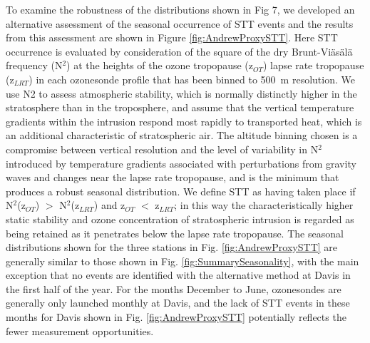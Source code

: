 \documentclass{article}
\begin{document}
  
  To examine the robustness of the distributions shown in Fig 7, we developed an alternative assessment of the seasonal occurrence of STT events and the results from this assessment are shown in Figure \ref{fig:AndrewProxySTT}.
  Here STT occurrence is evaluated by consideration of the square of the dry Brunt-Viäsälä frequency (N$^2$) at the heights of the ozone tropopause (z$_{OT}$) lapse rate tropopause (z$_{LRT}$) in each ozonesonde profile that has been binned to 500~m resolution.
  We use N2 to assess atmospheric stability, which is normally distinctly higher in the stratosphere than in the troposphere, and assume that the vertical temperature gradients within the intrusion respond most rapidly to transported heat, which is an additional characteristic of stratospheric air.
  The altitude binning chosen is a compromise between vertical resolution and the level of variability in N$^2$ introduced by temperature gradients associated with perturbations from gravity waves and changes near the lapse rate tropopause, and is the minimum that produces a robust seasonal distribution.
  We define STT as having taken place if N$^2$(z$_{OT}$) $>$ N$^2$(z$_{LRT}$) and z$_{OT}$ $<$ z$_{LRT}$; in this way the characteristically higher static stability and ozone concentration of stratospheric intrusion is regarded as being retained as it penetrates below the lapse rate tropopause. 
  The seasonal distributions shown for the three stations in Fig. \ref{fig:AndrewProxySTT} are generally similar to those shown in Fig. \ref{fig:SummarySeasonality}, with the main exception that no events are identified with the alternative method at Davis in the first half of the year.
  For the months December to June, ozonesondes are generally only launched monthly at Davis, and the lack of STT events in these months for Davis shown in Fig. \ref{fig:AndrewProxySTT} potentially reflects the fewer measurement opportunities.
  
\end{document}
